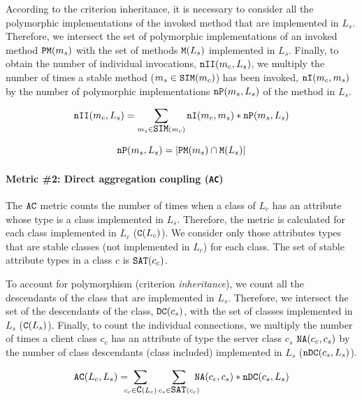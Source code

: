 According to the criterion inheritance, it is necessary to consider all the polymorphic implementations of the invoked method that are implemented in $L_s$. Therefore, we intersect the set of polymorphic implementations of an invoked method $\verb|PM|(m_s)$ with the set of methods $\verb|M|(L_s)$ implemented in $L_s$. Finally, to obtain the number of individual invocations, $\verb|nII|(m_c,L_s)$, we multiply the number of times a stable method ($m_s \in \verb|SIM|(m_c)$) has been invoked, $\verb|nI|(m_c, m_s)$ by the number of polymorphic implementations $\verb|nP|(m_s, L_s)$ of the method in $L_s$.

\begin{equation}
\label{eqn:mic-nii}
   \verb|nII|(m_c, L_s) = \sum_{m_s \in \verb|SIM|(m_c)} \verb|nI|(m_c, m_s)*\verb|nP|(m_s, L_s)
\end{equation}

\begin{equation}
\label{eqn:mic-np}
    \verb|nP|(m_s, L_s) = |\verb|PM|(m_s) \cap \verb|M|(L_s)|
\end{equation}

\paragraph{Metric \#2: Direct aggregation coupling (\texttt{AC})}

The $\verb|AC|$ metric counts the number of times when a class of $L_c$ has an attribute whose type is a class implemented in $L_s$. Therefore, the metric is calculated for each class implemented in $L_c$ ($\verb|C|(L_c)$). We consider only those attributes types that are stable classes (not implemented in $L_c$) for each class. The set of stable attribute types in a class $c$ is $\verb|SAT|(c_c)$.

To account for polymorphism (criterion \textit{inheritance}), we count all the descendants of the class that are implemented in $L_s$. Therefore, we intersect the set of the descendants of the class, $\verb|DC|(c_s)$, with the set of
classes implemented in $L_s$ ($\verb|C|(L_s)$). Finally, to count the  individual connections, we multiply the number of times a client class $c_c$ has an attribute of type the server class $c_s$ $\verb|NA|(c_c, c_s)$ by the number of class descendants (class included) implemented in $L_s$ ($\verb|nDC|(c_s,L_s)$).

\begin{equation}
\label{eqn:ac}
  \verb|AC|(L_c,L_s) = \!\!\!\!\sum_{c_c \in \verb|C|(L_c)} \sum_{c_s \in \verb|SAT|(c_c)} \!\!\!\!\verb|NA|(c_c, c_s)*\verb|nDC|(c_s, L_s)
\end{equation}


